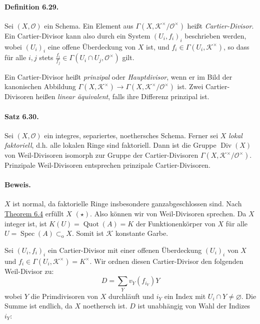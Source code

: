 \documentclass[11pt,b5paper,openany]{memoir}
\begin{document}
\paragraph{Definition 6.29.}\label{6.29} Sei $(X,\mathcal{O})$ ein Schema. Ein Element aus $\Gamma(X,\mathcal{K}^\times/\mathcal{O}^\times)$ heißt \textit{Cartier-Divisor}. Ein Cartier-Divisor kann also durch ein System $(U_i,f_i)_i$ beschrieben werden, wobei $(U_i)_i$ eine offene Überdeckung von $X$ ist, und $f_i\in\Gamma(U_i,\mathcal{K}^\times)$, so dass für alle $i,j$ stets $\frac{f_i}{f_j}\in\Gamma(U_i\cap U_j,\mathcal{O}^\times)$ gilt.

Ein Cartier-Divisor heißt \textit{prinzipal} oder \textit{Hauptdivisor}, wenn er im Bild der kanonischen Abbildung $\Gamma(X,\mathcal{K}^\times)\to\Gamma(X,\mathcal{K}^\times/\mathcal{O}^\times)$ ist. Zwei Cartier-Divisoren heißen \textit{linear äquivalent}, falls ihre Differenz prinzipal ist.

\paragraph{Satz 6.30.}\label{6.30} Sei $(X,\mathcal{O})$ ein integres, separiertes, noethersches Schema. Ferner sei $X$ \textit{lokal faktoriell}, d.h. alle lokalen Ringe sind faktoriell. Dann ist die Gruppe $\operatorname{Div}(X)$ von Weil-Divisoren isomorph zur Gruppe der Cartier-Divisoren $\Gamma(X,\mathcal{K}^\times/\mathcal{O}^\times)$. Prinzipale Weil-Divisoren entsprechen prinzipale Cartier-Divisoren.

\paragraph{Beweis.} $X$ ist normal, da faktorielle Ringe insbesondere ganzabgeschlossen sind. Nach \hyperref[6.4]{Theorem 6.4} erfüllt $X$ $(\star)$. Also können wir von Weil-Divisoren sprechen. Da $X$ integer ist, ist $K(U)=\operatorname{Quot}(A)= K$ der Funktionenkörper von $X$ für alle $U=\operatorname{Spec}(A)\subset_\text{o}X$. Somit ist $\mathcal{K}$ konstante Garbe.

Sei $(U_i,f_i)_i$ ein Cartier-Divisor mit einer offenen Überdeckung $(U_i)_i$ von $X$ und $f_i\in\Gamma(U_i,\mathcal{K}^\times)=K^\times$. Wir ordnen diesen Cartier-Divisor den folgenden Weil-Divisor zu:
\[D=\sum_Y v_Y(f_{i_Y})Y \]
wobei $Y$ die Primdivisoren von $X$ durchläuft und $i_Y$ ein Index mit $U_i\cap Y\neq\varnothing$. Die Summe ist endlich, da $X$ noethersch ist. $D$ ist unabhängig von Wahl der Indizes $i_Y$:
\end{document}
